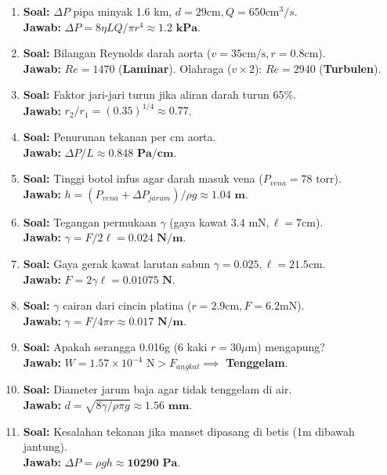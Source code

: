 \documentclass{article}
\begin{document}
\begin{enumerate}[label=\textbf{\arabic*.}]
    \item \textbf{Soal:} $\Delta P$ pipa minyak 1.6 km, $d=29\text{cm}, Q=650\text{cm}^3/s$. \\
    \textbf{Jawab:} $\Delta P = 8\eta LQ/\pi r^4 \approx \mathbf{1.2 \text{ kPa}}$.

    \item \textbf{Soal:} Bilangan Reynolds darah aorta ($v=35\text{cm/s}, r=0.8\text{cm}$). \\
    \textbf{Jawab:} $Re = 1470$ (\textbf{Laminar}). Olahraga ($v \times 2$): $Re = 2940$ (\textbf{Turbulen}).

    \item \textbf{Soal:} Faktor jari-jari turun jika aliran darah turun 65\%. \\
    \textbf{Jawab:} $r_2/r_1 = (0.35)^{1/4} \approx \mathbf{0.77}$.

    \item \textbf{Soal:} Penurunan tekanan per cm aorta. \\
    \textbf{Jawab:} $\Delta P/L \approx \mathbf{0.848 \text{ Pa/cm}}$.

    \item \textbf{Soal:} Tinggi botol infus agar darah masuk vena ($P_{vena} = 78 \text{ torr}$). \\
    \textbf{Jawab:} $h = (P_{vena} + \Delta P_{jarum})/\rho g \approx \mathbf{1.04 \text{ m}}$.

    \item \textbf{Soal:} Tegangan permukaan $\gamma$ (gaya kawat $3.4 \text{ mN}, \ell = 7\text{cm}$). \\
    \textbf{Jawab:} $\gamma = F/2\ell = \mathbf{0.024 \text{ N/m}}$.

    \item \textbf{Soal:} Gaya gerak kawat larutan sabun $\gamma=0.025, \ell=21.5\text{cm}$. \\
    \textbf{Jawab:} $F = 2\gamma\ell = \mathbf{0.01075 \text{ N}}$.

    \item \textbf{Soal:} $\gamma$ cairan dari cincin platina ($r=2.9\text{cm}, F=6.2\text{mN}$). \\
    \textbf{Jawab:} $\gamma = F/4\pi r \approx \mathbf{0.017 \text{ N/m}}$.

    \item \textbf{Soal:} Apakah serangga 0.016g (6 kaki $r=30\mu\text{m}$) mengapung? \\
    \textbf{Jawab:} $W = 1.57 \times 10^{-4} \text{ N} > F_{angkat} \implies$ \textbf{Tenggelam}.

    \item \textbf{Soal:} Diameter jarum baja agar tidak tenggelam di air. \\
    \textbf{Jawab:} $d = \sqrt{8\gamma / \rho \pi g} \approx \mathbf{1.56 \text{ mm}}$.

    \item \textbf{Soal:} Kesalahan tekanan jika manset dipasang di betis (1m dibawah jantung). \\
    \textbf{Jawab:} $\Delta P = \rho gh \approx \mathbf{10290 \text{ Pa}}$.

\end{enumerate}
\end{document}
